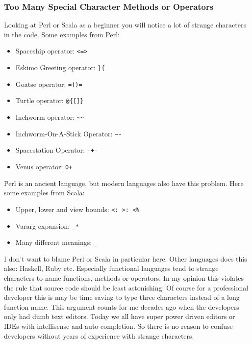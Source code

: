 \documentclass[a4paper,12pt]{article}
\begin{document}

\subsubsection{Too Many Special Character Methods or Operators}

Looking at Perl or Scala as a beginner you will notice a lot of strange characters in the code.
Some examples from Perl\cite{secret-perl-operators}:

\begin{itemize}
	\item Spaceship operator: \verb|<=>|
	\item Eskimo Greeting operator: \verb|}{|
	\item Goatse operator: \verb|=()=|
	\item Turtle operator: \verb|@{[]}|
	\item Inchworm operator: \verb|~~|
	\item Inchworm-On-A-Stick Operator: \verb|~-|
	\item Spacestation Operator: \verb|-+-|
	\item Venus operator: \verb|0+|
\end{itemize}

Perl is an ancient language, but modern languages also have this problem. Here some examples from Scala\cite{special-operators-scala}:

\begin{itemize}
	\item Upper, lower and view bounds: \verb|<: >: <%|
	\item Vararg expansion: \verb|_*|
	\item Many different meanings: \verb|_|
\end{itemize}

I don't want to blame Perl or Scala in particular here. Other languages does this also: Haskell, Ruby etc. Especially functional languages tend to strange characters to name functions, methods or operators. In my opinion this violates the rule that source code should be least astonishing. Of course for a professional developer this is may be time saving to type three characters instead of a long function name. This argument counts for me decades ago when the developers only had dumb text editors. Today we all have super power driven editors or IDEs with intellisense and auto completion. So there is no reason to confuse developers without years of experience with strange characters.
\end{document}
